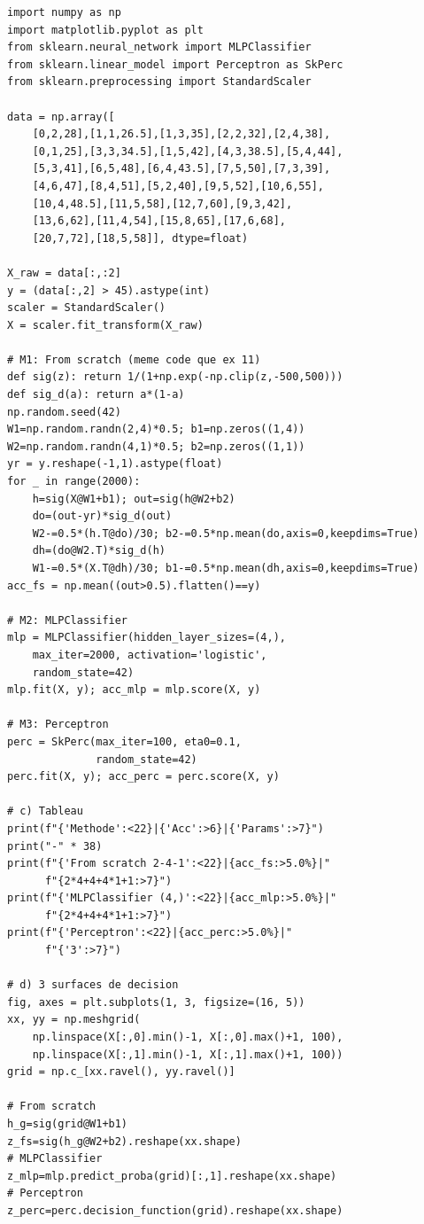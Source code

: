 \begin{pythonbox}
\begin{lstlisting}
import numpy as np
import matplotlib.pyplot as plt
from sklearn.neural_network import MLPClassifier
from sklearn.linear_model import Perceptron as SkPerc
from sklearn.preprocessing import StandardScaler

data = np.array([
    [0,2,28],[1,1,26.5],[1,3,35],[2,2,32],[2,4,38],
    [0,1,25],[3,3,34.5],[1,5,42],[4,3,38.5],[5,4,44],
    [5,3,41],[6,5,48],[6,4,43.5],[7,5,50],[7,3,39],
    [4,6,47],[8,4,51],[5,2,40],[9,5,52],[10,6,55],
    [10,4,48.5],[11,5,58],[12,7,60],[9,3,42],
    [13,6,62],[11,4,54],[15,8,65],[17,6,68],
    [20,7,72],[18,5,58]], dtype=float)

X_raw = data[:,:2]
y = (data[:,2] > 45).astype(int)
scaler = StandardScaler()
X = scaler.fit_transform(X_raw)

# M1: From scratch (meme code que ex 11)
def sig(z): return 1/(1+np.exp(-np.clip(z,-500,500)))
def sig_d(a): return a*(1-a)
np.random.seed(42)
W1=np.random.randn(2,4)*0.5; b1=np.zeros((1,4))
W2=np.random.randn(4,1)*0.5; b2=np.zeros((1,1))
yr = y.reshape(-1,1).astype(float)
for _ in range(2000):
    h=sig(X@W1+b1); out=sig(h@W2+b2)
    do=(out-yr)*sig_d(out)
    W2-=0.5*(h.T@do)/30; b2-=0.5*np.mean(do,axis=0,keepdims=True)
    dh=(do@W2.T)*sig_d(h)
    W1-=0.5*(X.T@dh)/30; b1-=0.5*np.mean(dh,axis=0,keepdims=True)
acc_fs = np.mean((out>0.5).flatten()==y)

# M2: MLPClassifier
mlp = MLPClassifier(hidden_layer_sizes=(4,),
    max_iter=2000, activation='logistic',
    random_state=42)
mlp.fit(X, y); acc_mlp = mlp.score(X, y)

# M3: Perceptron
perc = SkPerc(max_iter=100, eta0=0.1,
              random_state=42)
perc.fit(X, y); acc_perc = perc.score(X, y)

# c) Tableau
print(f"{'Methode':<22}|{'Acc':>6}|{'Params':>7}")
print("-" * 38)
print(f"{'From scratch 2-4-1':<22}|{acc_fs:>5.0%}|"
      f"{2*4+4+4*1+1:>7}")
print(f"{'MLPClassifier (4,)':<22}|{acc_mlp:>5.0%}|"
      f"{2*4+4+4*1+1:>7}")
print(f"{'Perceptron':<22}|{acc_perc:>5.0%}|"
      f"{'3':>7}")

# d) 3 surfaces de decision
fig, axes = plt.subplots(1, 3, figsize=(16, 5))
xx, yy = np.meshgrid(
    np.linspace(X[:,0].min()-1, X[:,0].max()+1, 100),
    np.linspace(X[:,1].min()-1, X[:,1].max()+1, 100))
grid = np.c_[xx.ravel(), yy.ravel()]

# From scratch
h_g=sig(grid@W1+b1)
z_fs=sig(h_g@W2+b2).reshape(xx.shape)
# MLPClassifier
z_mlp=mlp.predict_proba(grid)[:,1].reshape(xx.shape)
# Perceptron
z_perc=perc.decision_function(grid).reshape(xx.shape)


\end{lstlisting}
\end{pythonbox}
